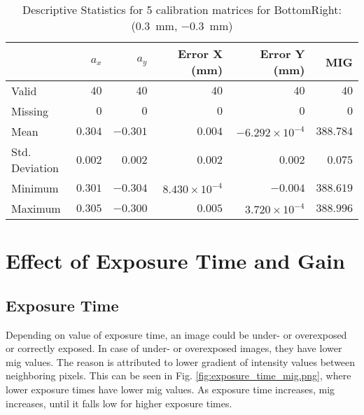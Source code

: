 \begin{table}[h]
    \begin{subtable}{\textwidth}
        \centering
        \footnotesize
        \begin{tabular}{lrrrrr}
            \toprule
                & $a_x$ & $a_y$ & Error X (mm) & Error Y (mm) & MIG  \\
            \midrule
			Valid & $40$ & $40$ & $40$ & $40$ & $40$  \\
			Missing & $0$ & $0$ & $0$ & $0$ & $0$  \\
			Mean & $0.304$ & $-0.301$ & $0.004$ & $-6.292\times10^{-4}$ & $388.784$  \\
			Std. Deviation & $0.002$ & $0.002$ & $0.002$ & $0.002$ & $0.075$  \\
			Minimum & $0.301$ & $-0.304$ & $8.430\times10^{-4}$ & $-0.004$ & $388.619$  \\
			Maximum & $0.305$ & $-0.300$ & $0.005$ & $3.720\times10^{-4}$ & $388.996$  \\
            \bottomrule
        \end{tabular}
        \caption{$T_{Avg}$}
        \end{subtable}

    \caption{Descriptive Statistics for 5 calibration matrices for \textsf{BottomRight:} (\SI{0.3}{\milli\meter}, \SI{-0.3}{\milli\meter})}
    \label{table:stats_matrix_bottomright}
\end{table}

\clearpage
\section{Effect of Exposure Time and Gain} \label{section:effect_of_exp_time_gain}
\subsection*{Exposure Time}
Depending on value of exposure time, an image could be under- or overexposed or correctly exposed. In case of under- or overexposed images, they have lower \gls{mig} values. The reason is attributed to lower gradient of intensity values between neighboring pixels. This can be seen in Fig. \ref{fig:exposure_time_mig.png}, where lower exposure times have lower \gls{mig} values. As exposure time increases, \gls{mig} increases, until it falls low for higher exposure times.

